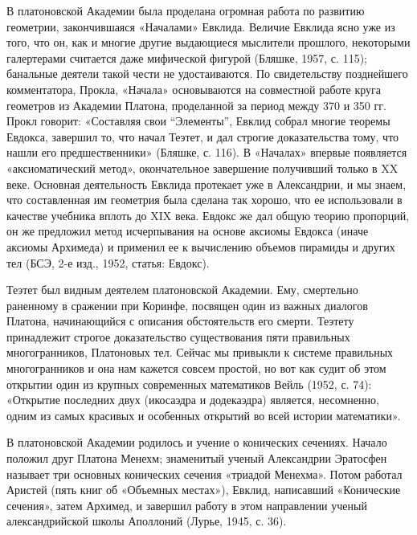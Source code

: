 В  платоновской Академии  была проделана  огромная работа  по развитию
геометрии, закончившаяся «Началами» Евклида.  Величие Евклида ясно уже
из того,  что он, как  и многие другие выдающиеся  мыслители прошлого,
некоторыми  галертерами  считается  даже мифической  фигурой  (Бляшке,
1957,  с. 115);  банальные деятели  такой чести  не удостаиваются.  По
свидетельству позднейшего комментатора,  Прокла, «Начала» основываются
на совместной работе круга  геометров из Академии Платона, проделанной
за  период  между  370  и  350  гг.  Прокл  говорит:  «Составляя  свои
``Элементы'', Евклид  собрал многие теоремы Евдокса,  завершил то, что
начал  Теэтет,  и  дал  строгие доказательства  тому,  что  нашли  его
предшественники»  (Бляшке, с.  116).  В  «Началах» впервые  появляется
«аксиоматический метод», окончательное  завершение получивший только в
XX веке. Основная деятельность Евклида  протекает уже в Александрии, и
мы знаем, что  составленная им геометрия была сделана  так хорошо, что
ее использовали в качестве учебника вплоть  до XIX века. Евдокс же дал
общую теорию пропорций,  он же предложил метод  исчерпывания на основе
аксиомы Евдокса  (иначе аксиомы Архимеда)  и применил ее  к вычислению
объемов пирамиды и других тел (БСЭ, 2-е изд., 1952, статья: Евдокс).

Теэтет  был видным  деятелем  платоновской  Академии. Ему,  смертельно
раненному в  сражении при  Коринфе, посвящен  один из  важных диалогов
Платона,  начинающийся с  описания обстоятельств  его смерти.  Теэтету
принадлежит  строгое  доказательство   существования  пяти  правильных
многогранников,  Платоновых   тел.  Сейчас   мы  привыкли   к  системе
правильных многогранников и она нам кажется совсем простой, но вот как
судит об этом  открытии один из крупных  современных математиков Вейль
(1952,  с.  74): «Открытие  последних  двух  (икосаэдра и  додекаэдра)
является, несомненно, одним из самых  красивых и особенных открытий во
всей истории математики».

В  платоновской  Академии родилось  и  учение  о конических  сечениях.
Начало  положил друг  Платона  Менехм;  знаменитый ученый  Александрии
Эратосфен называет три основных  конических сечения «триадой Менехма».
Потом  работал  Аристей  (пять  книг об  «Объемных  местах»),  Евклид,
написавший «Конические  сечения», затем  Архимед, и завершил  работу в
этом направлении ученый александрийской  школы Аполлоний (Лурье, 1945,
с. 36).

